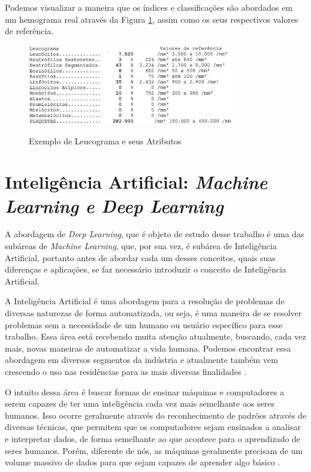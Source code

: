 Podemos visualizar a maneira que os índices e classificações são abordados em um hemograma real através da Figura \ref{fig:leucograma}, assim como os seus respectivos valores de referência.

\begin{figure}[!htb]
	\centering
	\caption{Exemplo de Leucograma e seus Atributos}
	\includegraphics[width=0.80\textwidth]{img/leucograma.jpg}
	\label{fig:leucograma}
\end{figure}

\section{Inteligência Artificial: \emph{Machine Learning e Deep Learning}}
\label{sec:conceito2}
A abordagem de \emph{Deep Learning}, que é objeto de estudo desse trabalho é uma das subáreas de \emph{Machine Learning}, que, por sua vez, é subárea de Inteligência Artificial, portanto antes de abordar cada um desses conceitos, quais suas diferenças e aplicações, se faz necessário introduzir o conceito de Inteligência Artificial.

A Inteligência Artificial é uma abordagem para a resolução de problemas de diversas naturezas de forma automatizada, ou seja, é uma maneira de se resolver problemas sem a necessidade de um humano ou usuário específico para esse trabalho. Essa área está recebendo muita atenção atualmente, buscando, cada vez mais, novas maneiras de automatizar a vida humana. Podemos encontrar essa abordagem em diversos segmentos da indústria e atualmente também vem crescendo o uso nas residências para as mais diversas finalidades \cite{inteligenciaArtificial}.

O intuito dessa área é buscar formas de ensinar máquinas e computadores a serem capazes de ter uma inteligência cada vez mais semelhante aos seres humanos. Isso ocorre geralmente através do reconhecimento de padrões através de diversas técnicas, que permitem que os computadores sejam ensinados a analisar e interpretar dados, de forma semelhante ao que acontece para o aprendizado de seres humanos. Porém, diferente de nós, as máquinas geralmente precisam de um volume massivo de dados para que sejam capazes de aprender algo básico \cite{IAAprendizadoMaquina}.

